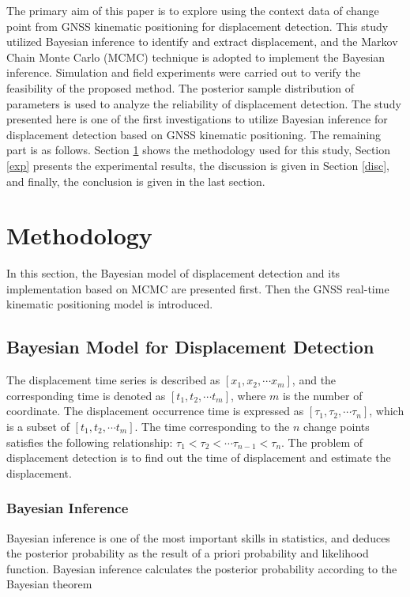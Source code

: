 \documentclass[final,3p,times]{elsarticle}
\begin{document}
	The primary aim of this paper is to explore using the context data of change point from GNSS kinematic positioning for displacement detection. 
	This study utilized Bayesian inference to identify and extract displacement, and the Markov Chain Monte Carlo (MCMC) technique is adopted to implement the Bayesian inference. 
	Simulation and field experiments were carried out to verify the feasibility of the proposed method. 
	The posterior sample distribution of parameters is used to analyze the reliability of displacement detection. 
	The study presented here is one of the first investigations to utilize Bayesian inference for displacement detection based on GNSS kinematic positioning. 
	The remaining part is as follows. Section \ref{method} shows the methodology used for this study, Section \ref{exp} presents the experimental results, the discussion is given in Section \ref{disc}, and finally, the conclusion is given in the last section.
	
	
	\section{Methodology}
	\label{method}
	In this section, the Bayesian model of displacement detection and its implementation based on MCMC are presented first. Then the GNSS  real-time kinematic positioning model is introduced.
	\subsection{Bayesian Model for Displacement Detection}
	
	
	The displacement time series is described as $\left[ {{x_1},{x_2}, \cdots {x_m}} \right]$, and the corresponding time is denoted as $\left[ {{t_1},{t_2}, \cdots {t_m}} \right]$, where $m$ is the number of coordinate. The displacement occurrence time is expressed as $\left[ {{\tau _1},{\tau _2}, \cdots {\tau _n}} \right]$, which is a subset of $\left[ {{t_1},{t_2}, \cdots {t_m}} \right]$.  
	The time corresponding to the $n$ change points satisfies the following relationship: $ {{\tau _1}<{\tau _2}<\cdots {\tau _{n-1}}<{\tau _n}} $.
	The problem of displacement detection is to find out the time of displacement and estimate the displacement.
	
	\subsubsection{Bayesian Inference}
	Bayesian inference is one of the most important skills in statistics, and deduces the posterior probability as the result of a priori probability and likelihood function\cite{robert2014machine}. Bayesian inference calculates the posterior probability according to the Bayesian theorem\cite{chen2009modulation,chen2013bayesian}
	
\end{document}
